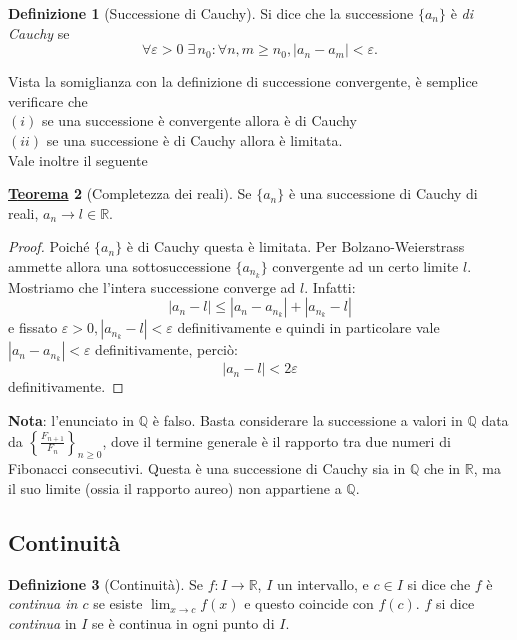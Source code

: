 \documentclass[a4paper,twoside]{article}
\renewcommand{\epsilon}{\varepsilon}
\newcommand{\Q}{\mathbb{Q}}
\newcommand{\R}{\mathbb{R}}
\theoremstyle{definition}
\newtheorem{theorem}{\color{Red}\underline{\textrm Teorema}}
\newtheorem{definizione}[theorem]{Definizione}
\numberwithin{theorem}{section}
\begin{document}
\begin{definizione}[Successione di Cauchy]
Si dice che la successione $\{a_n\}$ è \emph{di Cauchy} se
$$\forall\epsilon>0 \;\exists\, n_0:\forall n,m\geq n_0, |a_n-a_m|<\epsilon.$$
\end{definizione}
Vista la somiglianza con la definizione di successione convergente, è semplice verificare che\\
$(i)$ se una successione è convergente allora è di Cauchy \\
$(ii)$ se una successione è di Cauchy allora è limitata.\\
Vale inoltre il seguente
\begin{theorem}[Completezza dei reali]
Se $\{a_n\}$ è una successione di Cauchy di reali, $a_n\to l\in\mathbb{R}$.\end{theorem}
\begin{proof}
Poiché $\{a_n\}$ è di Cauchy questa è limitata. Per Bolzano-Weierstrass ammette allora una sottosuccessione $\{a_{n_k}\}$ convergente ad un certo limite $l$. 
Mostriamo che l'intera successione converge ad $l$. Infatti:
$$|a_n-l|\leq|a_n-a_{n_k}| +|a_{n_k}-l|$$ e fissato $\epsilon>0, |a_{n_k}-l|<\epsilon$ definitivamente e quindi in particolare vale $|a_n-a_{n_k}|<\epsilon$ definitivamente, perciò: $$|a_n-l|<2\epsilon$$
definitivamente.
\end{proof}

\textbf{Nota}: l'enunciato in $\Q$ è falso. Basta considerare la successione a valori in $\Q$ data da $\left\{\frac{F_{n+1}}{F_n}\right\}_{n\geq 0}$, dove il termine generale è il rapporto tra due numeri di Fibonacci consecutivi. Questa è una successione di Cauchy sia in $\Q$ che in $\R$, ma il suo limite (ossia il rapporto aureo) non appartiene a $\Q$.

\subsection{Continuità}
\begin{definizione}[Continuità]
Se $f:I\to\R$, $I$ un intervallo, e $c\in I$ si dice che $f$ è \emph{continua in $c$} se esiste $\lim_{x\to c}f(x)$ e questo coincide con $f(c)$. 
$f$ si dice \emph{continua} in $I$ se è continua in ogni punto di $I$. \end{definizione}
\end{document}
